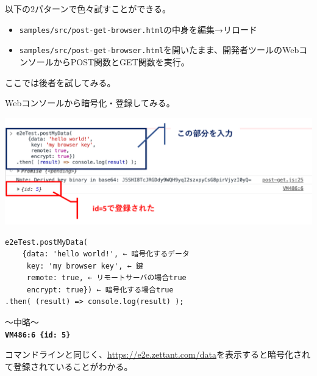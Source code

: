 \documentclass[12pt,dvipdfmx]{beamer}
\begin{document}
\begin{frame}
以下の2パターンで色々試すことができる。
\begin{itemize}
 \item \texttt{samples/src/post-get-browser.html}の中身を編集→リロード
 \item \texttt{samples/src/post-get-browser.html}を開いたまま、開発者ツールのWebコンソールからPOST関数とGET関数を実行。
\end{itemize}
ここでは後者を試してみる。
\end{frame}

\begin{frame}[fragile]
Webコンソールから暗号化・登録してみる。
\begin{center}
\includegraphics[width=0.9\linewidth]{Figs/browser-img2.pdf}
\end{center}

\begin{exampleblock}{}\footnotesize
\begin{verbatim}
e2eTest.postMyData(
    {data: 'hello world!', ← 暗号化するデータ
     key: 'my browser key', ← 鍵
     remote: true, ← リモートサーバの場合true
     encrypt: true}) ← 暗号化する場合true
.then( (result) => console.log(result) );
\end{verbatim}
〜中略〜\\[1ex]
\textbf{\texttt{VM486:6 \{id: 5\}}}
\end{exampleblock}
\end{frame}

\begin{frame}
 コマンドラインと同じく、\url{https://e2e.zettant.com/data}を表示すると暗号化されて登録されていることがわかる。
\end{frame}
\end{document}
